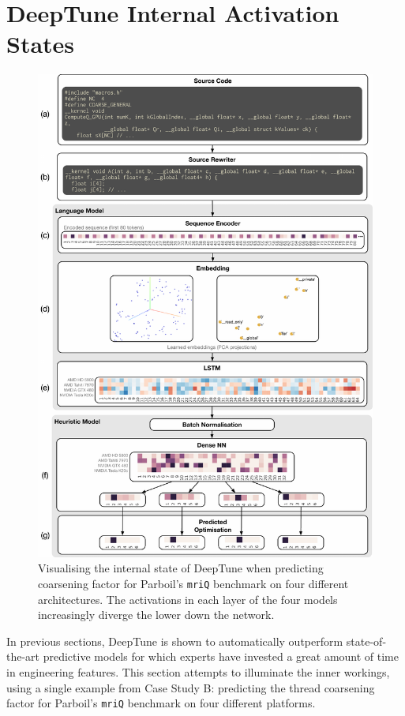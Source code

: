 \section{DeepTune Internal Activation States}
\label{sec:deeptune-internal-states}

\begin{figure}
  \centering %
  \includegraphics[width=\textwidth]{img/viz}%
  \caption[Visualising the internal state of DeepTune]{%
    Visualising the internal state of DeepTune when predicting coarsening factor for Parboil's \texttt{mriQ} benchmark on four different architectures. The activations in each layer of the four models increasingly diverge the lower down the network.%
  }
  \label{fig:viz} %
\end{figure}

In previous sections, DeepTune is shown to automatically outperform state-of-the-art predictive models for which experts have invested a great amount of time in engineering features. This section attempts to illuminate the inner workings, using a single example from Case Study B: predicting the thread coarsening factor for Parboil's \texttt{mriQ} benchmark on four different platforms.

